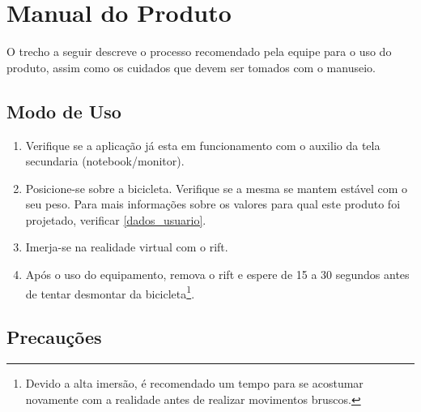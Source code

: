 \chapter{Manual do Produto} %
\label{cha:manual_do_produto}
 
O trecho a seguir descreve o processo recomendado pela equipe para o uso do produto, assim como os cuidados que devem ser tomados com o manuseio.

\section{Modo de Uso} %
\label{sec:modo_de_uso}

\begin{enumerate}
	\item Verifique se a aplicação já esta em funcionamento com o auxilio da tela secundaria (notebook/monitor).
	\item Posicione-se sobre a bicicleta. Verifique se a mesma se mantem  estável com o seu peso. Para mais informações sobre os valores para qual este produto foi projetado, verificar \autoref{dados_usuario}.
	\item Imerja-se na realidade virtual com o \gls{rift}.
	\item Após o uso do equipamento, remova o \gls{rift} e espere de 15 a 30 segundos antes de tentar desmontar da bicicleta\footnote{Devido a alta imersão, é recomendado um tempo para se acostumar novamente com a realidade antes de realizar movimentos bruscos.}.
\end{enumerate}

\section{Precauções} %
\label{sec:precau_es}

